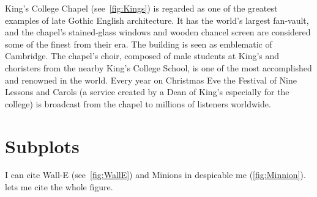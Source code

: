 \documentclass{report}
\begin{document}
King's College Chapel (see~\cref{fig:Kings}) is regarded as one of the 
greatest examples of late Gothic English architecture. It has the world's 
largest fan-vault, and the chapel's stained-glass windows and wooden chancel 
screen are considered some of the finest from their era. The building is seen 
as emblematic of Cambridge. The chapel's choir, composed of male students at 
King's and choristers from the nearby King's College School, is one of the most 
accomplished and renowned in the world. Every year on Christmas Eve the 
Festival of Nine Lessons and Carols (a service created by a Dean of King's 
especially for the college) is broadcast from the chapel to millions of 
listeners worldwide.


\section*{Subplots}

I can cite Wall-E (see~\cref{fig:WallE}) and Minions in despicable me 
(\cref{fig:Minnion}).~ lets me cite the whole figure.


\end{document}
